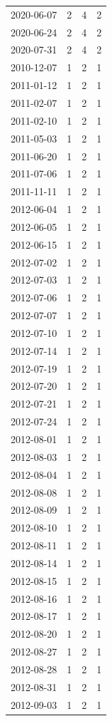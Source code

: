 \begin{tabular}{lrrr}
2020-06-07 & 2 & 4 & 2 \\
2020-06-24 & 2 & 4 & 2 \\
2020-07-31 & 2 & 4 & 2 \\
2010-12-07 & 1 & 2 & 1 \\
2011-01-12 & 1 & 2 & 1 \\
2011-02-07 & 1 & 2 & 1 \\
2011-02-10 & 1 & 2 & 1 \\
2011-05-03 & 1 & 2 & 1 \\
2011-06-20 & 1 & 2 & 1 \\
2011-07-06 & 1 & 2 & 1 \\
2011-11-11 & 1 & 2 & 1 \\
2012-06-04 & 1 & 2 & 1 \\
2012-06-05 & 1 & 2 & 1 \\
2012-06-15 & 1 & 2 & 1 \\
2012-07-02 & 1 & 2 & 1 \\
2012-07-03 & 1 & 2 & 1 \\
2012-07-06 & 1 & 2 & 1 \\
2012-07-07 & 1 & 2 & 1 \\
2012-07-10 & 1 & 2 & 1 \\
2012-07-14 & 1 & 2 & 1 \\
2012-07-19 & 1 & 2 & 1 \\
2012-07-20 & 1 & 2 & 1 \\
2012-07-21 & 1 & 2 & 1 \\
2012-07-24 & 1 & 2 & 1 \\
2012-08-01 & 1 & 2 & 1 \\
2012-08-03 & 1 & 2 & 1 \\
2012-08-04 & 1 & 2 & 1 \\
2012-08-08 & 1 & 2 & 1 \\
2012-08-09 & 1 & 2 & 1 \\
2012-08-10 & 1 & 2 & 1 \\
2012-08-11 & 1 & 2 & 1 \\
2012-08-14 & 1 & 2 & 1 \\
2012-08-15 & 1 & 2 & 1 \\
2012-08-16 & 1 & 2 & 1 \\
2012-08-17 & 1 & 2 & 1 \\
2012-08-20 & 1 & 2 & 1 \\
2012-08-27 & 1 & 2 & 1 \\
2012-08-28 & 1 & 2 & 1 \\
2012-08-31 & 1 & 2 & 1 \\
2012-09-03 & 1 & 2 & 1 \\

\end{tabular}
